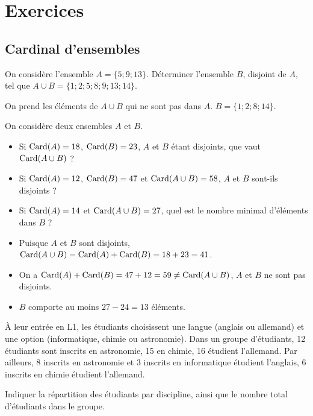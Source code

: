 \documentclass[11pt,fleqn, openany]{book} %
\begin{document}

\chapter{Exercices}

\section*{Cardinal d'ensembles}

\begin{exercise}On considère l'ensemble $A=\{5;9;13\}$. Déterminer l'ensemble $B$, disjoint de $A$, tel que $A\cup B =\{1;2;5;8;9;13;14\}$.\end{exercise}

\begin{solution} On prend les éléments de $A \cup B$ qui ne sont pas dans $A$. $B=\{1;2;8;14\}$.\end{solution}


\begin{exercise}On considère deux ensembles $A$ et $B$.
\begin{itemize}
\item Si $\mathrm{Card}(A)=18$, $\mathrm{Card}(B)=23$, $A$ et $B$ étant disjoints, que vaut $\mathrm{Card}(A \cup B)$ ?
\item Si $\mathrm{Card}(A)=12$, $\mathrm{Card}(B)=47$ et $\mathrm{Card}(A \cup B) = 58$, $A$ et $B$ sont-ils disjoints ?
\item Si $\mathrm{Card}(A)=14$ et $\mathrm{Card}(A \cup B) = 27$, quel est le nombre minimal d'éléments dans $B$ ?
\end{itemize}\end{exercise}

\begin{solution}\hspace{0pt}
\begin{itemize}
\item Puisque $A$ et $B$ sont disjoints, $\mathrm{Card}(A \cup B)=\mathrm{Card}(A) + \mathrm{Card}(B) = 18 + 23 = 41$.
\item On a $\mathrm{Card}(A)+\mathrm{Card}(B)=47+12=59 \neq \mathrm{Card}(A \cup B)$, $A$ et $B$ ne sont pas disjoints.
\item $B$ comporte au moins $27-24=13$ éléments.\end{itemize}
\end{solution}



\begin{exercise}À leur entrée en L1, les étudiants choisissent une langue (anglais ou allemand) et une option (informatique, chimie ou astronomie). Dans un groupe d'étudiants, 12 étudiants sont inscrits en astronomie, 15 en chimie, 16 étudient l'allemand. Par ailleurs, 8 inscrits en astronomie et 3 inscrits en informatique étudient l'anglais, 6 inscrits en chimie étudient l'allemand.

Indiquer la répartition des étudiants par discipline, ainsi que le nombre total d'étudiants dans le groupe.\end{exercise}
\end{document}
